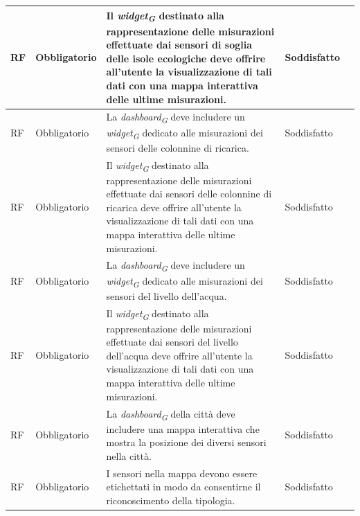 \begin{longtable}{|C{1.5cm}|C{2cm}|L{5cm}|C{2cm}|C{1.5cm}|}
    \hline
     RF & Obbligatorio &Il \textit{widget}\textsubscript{\textit{G}} destinato alla rappresentazione delle misurazioni effettuate dai sensori di soglia delle isole ecologiche deve offrire all'utente la visualizzazione di tali dati con una mappa interattiva delle ultime misurazioni.  & Soddisfatto \\
    
    \hline
     RF & Obbligatorio & La \textit{dashboard}\textsubscript{\textit{G}} deve includere un \textit{widget}\textsubscript{\textit{G}} dedicato alle misurazioni dei sensori delle colonnine di ricarica. & Soddisfatto \\
    
    \hline
     RF & Obbligatorio &Il \textit{widget}\textsubscript{\textit{G}} destinato alla rappresentazione delle misurazioni effettuate dai sensori delle colonnine di ricarica deve offrire all'utente la visualizzazione di tali dati con una mappa interattiva delle ultime misurazioni.  & Soddisfatto \\
    
    \hline
     RF & Obbligatorio & La \textit{dashboard}\textsubscript{\textit{G}} deve includere un \textit{widget}\textsubscript{\textit{G}} dedicato alle misurazioni dei sensori del livello dell'acqua. & Soddisfatto \\
    
    \hline
     RF & Obbligatorio &Il \textit{widget}\textsubscript{\textit{G}} destinato alla rappresentazione delle misurazioni effettuate dai sensori del livello dell'acqua deve offrire all'utente la visualizzazione di tali dati con una mappa interattiva delle ultime misurazioni. & Soddisfatto \\
    
    \hline
     RF & Obbligatorio & La \textit{dashboard}\textsubscript{\textit{G}} della città deve includere una mappa interattiva che mostra la posizione dei diversi sensori nella città.& Soddisfatto \\
    
    \hline
     RF & Obbligatorio & I sensori nella mappa devono essere etichettati in modo da consentirne il riconoscimento della tipologia.& Soddisfatto \\
    

\end{longtable}
